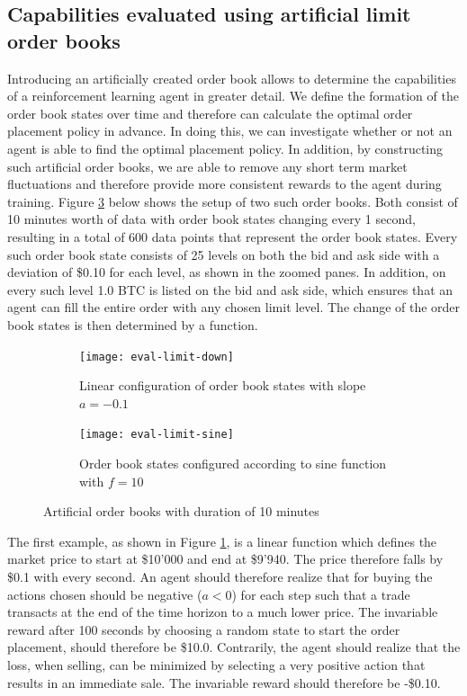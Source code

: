 \subsection{Capabilities evaluated using artificial limit order books}

Introducing an artificially created order book allows to determine the capabilities of a reinforcement learning agent in greater detail.
We define the formation of the order book states over time and therefore can calculate the optimal order placement policy in advance.
In doing this, we can investigate whether or not an agent is able to find the optimal placement policy.
In addition, by constructing such artificial order books, we are able to remove any short term market fluctuations and therefore provide more consistent rewards to the agent during training.
Figure \ref{fig:eval-limit-artificial} below shows the setup of two such order books.
Both consist of 10 minutes worth of data with order book states changing every 1 second, resulting in a total of 600 data points that represent the order book states.
Every such order book state consists of 25 levels on both the bid and ask side with a deviation of \$0.10 for each level, as shown in the zoomed panes.
In addition, on every such level 1.0 BTC is listed on the bid and ask side, which ensures that an agent can fill the entire order with any chosen limit level.
The change of the order book states is then determined by a function.
\begin{figure}[H]
    \centering
    \begin{subfigure}[b]{0.45\textwidth}
        \texttt{[image: eval-limit-down]}
        \caption{Linear configuration of order book states with slope $a=-0.1$}
        \label{fig:eval-limit-down}
    \end{subfigure}
    \begin{subfigure}[b]{0.45\textwidth}
        \texttt{[image: eval-limit-sine]}
        \caption{Order book states configured according to sine function with $f=10$}
        \label{fig:eval-limit-sine}
    \end{subfigure}
    \caption{Artificial order books with duration of 10 minutes}\label{fig:eval-limit-artificial}
\end{figure}

The first example, as shown in Figure \ref{fig:eval-limit-down}, is a linear function which defines the market price to start at \$10'000 and end at \$9'940.
The price therefore falls by \$0.1 with every second.
An agent should therefore realize that for buying the actions chosen should be negative ($a<0$) for each step such that a trade transacts at the end of the time horizon to a much lower price.
The invariable reward after 100 seconds by choosing a random state to start the order placement, should therefore be \$10.0.
Contrarily, the agent should realize that the loss, when selling, can be minimized by selecting a very positive action that results in an immediate sale.
The invariable reward should therefore be -\$0.10.

